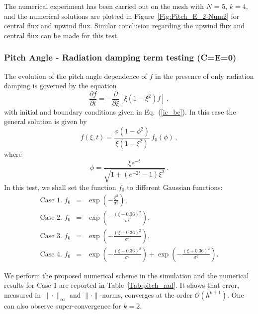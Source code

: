 \documentclass[preprint,11pt]{elsarticle}
\newcommand{\bq}{\begin{equation}}
\newcommand{\eq}{\end{equation}}
\begin{document}
%
The numerical experiment has been carried out on the mesh with $N$ = 5, $k = 4$, and the numerical solutions are plotted in Figure~\ref{Fig:Pitch_E_2-Num2} for central flux and upwind flux. Similar conclusion regarding the upwind flux and central flux can be made for this test.


\subsubsection{Pitch Angle - Radiation damping term testing (C=E=0)}
\label{Subsec:Pitch-3}
The evolution of the pitch angle dependence of $f$ in the presence of only radiation damping is governed by the equation
%
\bq
\label{pitch_Rad_eq}
\frac{\partial f}{\partial t}= -\frac{\partial}{\partial\xi} \left[\xi \left(1-\xi^2\right) f\right] \, ,
\eq
%
with initial and boundary conditions given in Eq.~(\ref{ic_bc}).
In this case the general solution is given by 
%
\bq
\label{pitch_Rad_sol}
f(\xi,t)=\frac{\phi \left ( 1- \phi^2\right)}{\xi \left(1-\xi^2\right)}\, f_0(\phi) \, ,
\eq
%
where
%
\bq
\phi=\frac{\xi e^{-t}}{\sqrt{1+\left(e^{-2t}-1\right) \xi^2}}\, .
\eq
%
 In this test, we shall set the function $f_0$ to different Gaussian functions:
\begin{eqnarray}
\text{Case 1.   }f_0 &=& \exp(-\frac{\xi^2}{\sigma^2}),\\
\text{Case 2.   }f_0 &=& \exp(-\frac{(\xi-0.36)^2}{\sigma^2}),\\
\text{Case 3.   }f_0 &=& \exp(-\frac{(\xi+0.36)^2}{\sigma^2}),\\
\text{Case 4.   }f_0 &=& \exp(-\frac{(\xi-0.36)^2}{\sigma^2})+\exp(-\frac{(\xi+0.36)^2}{\sigma^2}).
\end{eqnarray}

We perform the proposed numerical scheme in the simulation and the numerical results for Case 1 are reported in Table~\ref{Tab:pitch_rad}. It shows that error, measured in $\|\cdot\|_{\infty}$ and $\|\cdot\|$-norms, converges at the order $\mathcal{O}(h^{k+1})$. One can also observe super-convergence for $k=2$.
\end{document}
